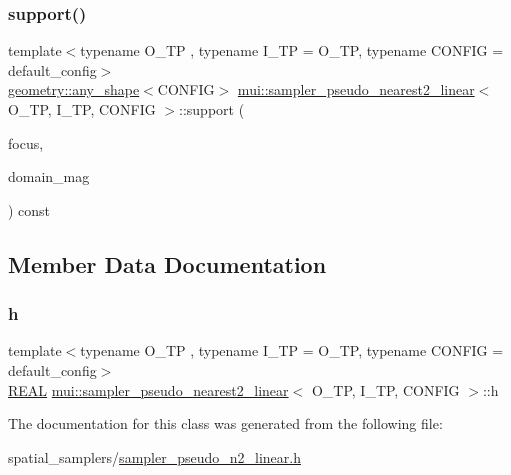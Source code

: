 \mbox{\label{classmui_1_1sampler__pseudo__nearest2__linear_a11f180774cc229847171aae2927f5469}} 
\subsubsection{\texorpdfstring{support()}{support()}}
{\footnotesize\ttfamily template$<$typename O\+\_\+\+TP , typename I\+\_\+\+TP  = O\+\_\+\+TP, typename C\+O\+N\+F\+IG  = default\+\_\+config$>$ \\
\hyperlink{classmui_1_1geometry_1_1any__shape}{geometry\+::any\+\_\+shape}$<$C\+O\+N\+F\+IG$>$ \hyperlink{classmui_1_1sampler__pseudo__nearest2__linear}{mui\+::sampler\+\_\+pseudo\+\_\+nearest2\+\_\+linear}$<$ O\+\_\+\+TP, I\+\_\+\+TP, C\+O\+N\+F\+IG $>$\+::support (\begin{DoxyParamCaption}\item[{\hyperlink{classmui_1_1sampler__pseudo__nearest2__linear_ab60b56e487c5be134d5efcbf03f7621f}{point\+\_\+type}}]{focus,  }\item[{\hyperlink{classmui_1_1sampler__pseudo__nearest2__linear_aa35e86c6cf0ff62396daf5a94b6d931e}{R\+E\+AL}}]{domain\+\_\+mag }\end{DoxyParamCaption}) const\hspace{0.3cm}{\ttfamily [inline]}}



\subsection{Member Data Documentation}
\mbox{\label{classmui_1_1sampler__pseudo__nearest2__linear_a47b63920b15a36ce8d716f89e72947ff}} 
\subsubsection{\texorpdfstring{h}{h}}
{\footnotesize\ttfamily template$<$typename O\+\_\+\+TP , typename I\+\_\+\+TP  = O\+\_\+\+TP, typename C\+O\+N\+F\+IG  = default\+\_\+config$>$ \\
\hyperlink{classmui_1_1sampler__pseudo__nearest2__linear_aa35e86c6cf0ff62396daf5a94b6d931e}{R\+E\+AL} \hyperlink{classmui_1_1sampler__pseudo__nearest2__linear}{mui\+::sampler\+\_\+pseudo\+\_\+nearest2\+\_\+linear}$<$ O\+\_\+\+TP, I\+\_\+\+TP, C\+O\+N\+F\+IG $>$\+::h\hspace{0.3cm}{\ttfamily [protected]}}



The documentation for this class was generated from the following file\+:\begin{DoxyCompactItemize}
\item 
spatial\+\_\+samplers/\hyperlink{sampler__pseudo__n2__linear_8h}{sampler\+\_\+pseudo\+\_\+n2\+\_\+linear.\+h}\end{DoxyCompactItemize}
